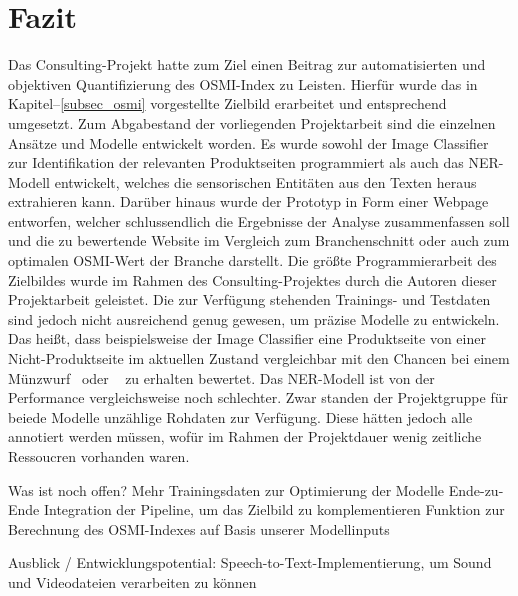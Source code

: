 \section{Fazit}

Das Consulting-Projekt hatte zum Ziel einen Beitrag zur automatisierten und objektiven Quantifizierung des
\ac{OSMI}-Index zu Leisten.
Hierfür wurde das in Kapitel–\ref{subsec_osmi} vorgestellte Zielbild erarbeitet und entsprechend umgesetzt.
Zum Abgabestand der vorliegenden Projektarbeit sind die einzelnen Ansätze und Modelle entwickelt worden.
Es wurde sowohl der Image Classifier zur Identifikation der relevanten Produktseiten programmiert als auch das \ac{NER}-Modell
entwickelt, welches die sensorischen Entitäten aus den Texten heraus extrahieren kann.
Darüber hinaus wurde der Prototyp in Form einer Webpage entworfen, welcher schlussendlich die Ergebnisse der Analyse
zusammenfassen soll und die zu bewertende Website im Vergleich zum Branchenschnitt oder auch zum optimalen \ac{OSMI}-Wert
der Branche darstellt.
Die größte Programmierarbeit des Zielbildes wurde im Rahmen des Consulting-Projektes durch die Autoren dieser Projektarbeit
geleistet.
Die zur Verfügung stehenden Trainings- und Testdaten sind jedoch nicht ausreichend genug gewesen, um präzise Modelle
zu entwickeln.
Das heißt, dass beispielsweise der Image Classifier eine Produktseite von einer Nicht-Produktseite im aktuellen Zustand vergleichbar
mit den Chancen bei einem Münzwurf \grqq~oder \grqq~ zu erhalten bewertet.
Das \ac{NER}-Modell ist von der Performance vergleichsweise noch schlechter.
Zwar standen der Projektgruppe für beiede Modelle unzählige Rohdaten zur Verfügung.
Diese hätten jedoch alle annotiert werden müssen, wofür im Rahmen der Projektdauer wenig zeitliche
Ressoucren vorhanden waren.


Was ist noch offen?
Mehr Trainingsdaten zur Optimierung der Modelle
Ende-zu-Ende Integration der Pipeline, um das Zielbild zu komplementieren
Funktion zur Berechnung des OSMI-Indexes auf Basis unserer Modellinputs

Ausblick  / Entwicklungspotential:
Speech-to-Text-Implementierung, um Sound und Videodateien verarbeiten zu können
